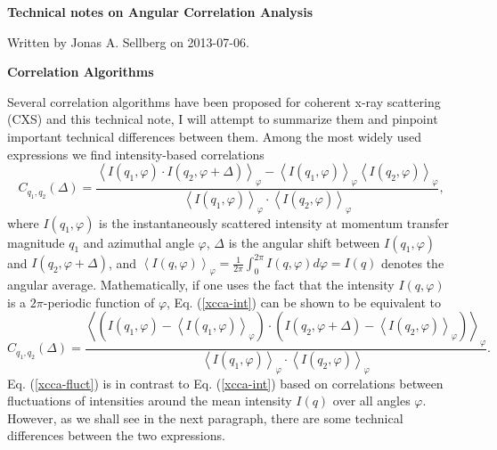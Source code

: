 \documentclass[12pt]{article}
\begin{document}
\begin{sffamily}
\begin{Large}
\noindent
\centering \textbf{Technical notes on Angular Correlation Analysis}\\
\vspace{1cm}
\end{Large}
\end{sffamily}
\noindent
Written by Jonas A. Sellberg on 2013-07-06.\\

\vspace{1cm}
\begin{sffamily}
\begin{Large}
\textbf{Correlation Algorithms}\\
\end{Large}
\end{sffamily}
\vspace{0.3cm}

Several correlation algorithms have been proposed for coherent x-ray scattering (CXS) and this technical note, I will attempt to summarize them and pinpoint important technical differences between them. Among the most widely used expressions we find intensity-based correlations
\begin{equation}\label{xcca-int}
C_{q_1,q_2}(\Delta) = \frac{\left\langle I(q_1,\varphi)\cdot I(q_2,\varphi+\Delta)\right\rangle_{\varphi}-\left\langle I(q_1,\varphi)\right\rangle_{\varphi}\left\langle I(q_2,\varphi)\right\rangle_{\varphi}}{\left\langle I(q_1,\varphi)\right\rangle_{\varphi}\cdot\left\langle I(q_2,\varphi)\right\rangle_{\varphi}},
\end{equation}
where $I(q_1,\varphi)$ is the instantaneously scattered intensity at momentum transfer magnitude $q_1$ and azimuthal angle $\varphi$, $\Delta$ is the angular shift between $I(q_1,\varphi)$ and $I(q_2,\varphi+\Delta)$, and $\left\langle I(q,\varphi) \right\rangle_{\varphi} = \frac{1}{2\pi} \int_0^{2\pi} I(q,\varphi) d\varphi = I(q)$ denotes the angular average. Mathematically, if one uses the fact that the intensity $I(q,\varphi)$ is a $2\pi$-periodic function of $\varphi$, Eq. (\ref{xcca-int}) can be shown to be equivalent to
\begin{equation}\label{xcca-fluct}
C_{q_1,q_2}(\Delta) = \frac{\left\langle \left(I(q_1,\varphi)-\left\langle I(q_1,\varphi)\right\rangle_{\varphi}\right)\cdot\left(I(q_2,\varphi+\Delta)-\left\langle I(q_2,\varphi)\right\rangle_{\varphi}\right)\right\rangle_{\varphi}}{\left\langle I(q_1,\varphi)\right\rangle_{\varphi}\cdot\left\langle I(q_2,\varphi)\right\rangle_{\varphi}}.
\end{equation}
Eq. (\ref{xcca-fluct}) is in contrast to Eq. (\ref{xcca-int}) based on correlations between fluctuations of intensities around the mean intensity $I(q)$ over all angles $\varphi$.  However, as we shall see in the next paragraph, there are some technical differences between the two expressions.
\end{document}
